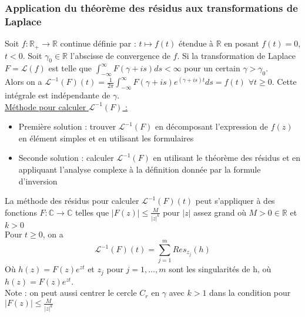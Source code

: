 \documentclass[../main.tex]{subfiles}
\begin{document}
\subsubsection{Application du théorème des résidus aux transformations de Laplace}
Soit $f:\mathbb{R}_+ \rightarrow \mathbb{R}$ continue définie par : $t\mapsto f(t)$ étendue à $\mathbb{R}$ en posant $f(t) = 0$, $t<0$. Soit $\gamma_0 \in \mathbb{R}$ l'abscisse de convergence de $f$. Si la transformation de Laplace $F= \mathcal{L}(f)$ est telle que $\int_{-\infty}^\infty F(\gamma+is)ds<\infty$ pour un certain $\gamma > \gamma_0$.\\
Alors on a $\mathcal{L}^{-1}(F)(t) = \frac{1}{2\pi} \int_{-\infty}^\infty F(\gamma+is)e^{(\gamma+is)t}ds = f(t)$ $\forall t\geq 0$. Cette intégrale est indépendante de $\gamma$.\\

\quad \underline{Méthode pour calculer $\mathcal{L}^{-1}(F)$ :}\\
\begin{itemize}
    \item Première solution : trouver $\mathcal{L}^{-1}(F)$ en décomposant l'expression de $f(z)$ en élément simples et en utilisant les formulaires\\
    \item Seconde solution : calculer $\mathcal{L}^{-1}(F)$ en utilisant le théorème des résidus et en appliquant l'analyse complexe à la définition donnée par la formule d'inversion\\
\end{itemize}

La méthode des résidus pour calculer $\mathcal{L}^{-1}(F)(t)$ peut s'appliquer à des fonctions $F : \mathbb{C} \rightarrow\mathbb{C}$ telles que $\lvert F(z) \rvert \leq \frac{M}{\lvert z \rvert^k}$ pour $\lvert z \rvert$ assez grand où $M>0 \in \mathbb{R}$ et $k>0$\\

Pour $t\geq 0$, on a \begin{equation}
    \mathcal{L}^{-1} (F)(t) = \sum_{j=1}^m Res_{z_j}(h)
\end{equation}
Où $h(z) = F(z) e^{zt}$ et $z_j$ pour $j=1,\dots,m$ sont les singularités de h, où $h(z) = F(z) e^{zt}$.\\

\color{gray}Note : on peut aussi centrer le cercle $C_r$ en $\gamma$ avec $k>1$ dans la condition pour $\lvert F(z) \rvert \leq \frac{M}{\lvert z \rvert^k}$\color{black}\\
\end{document}
